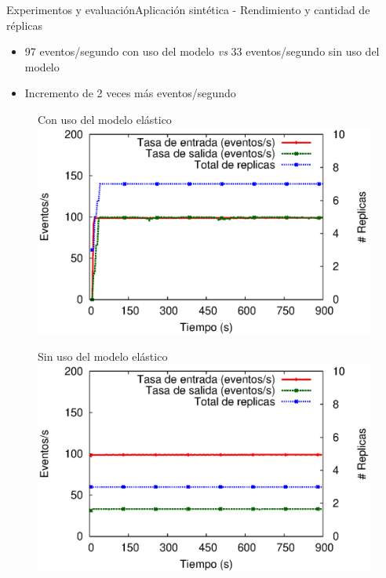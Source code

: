\begin{frame}{Experimentos y evaluación}{Aplicación sintética - Rendimiento y cantidad de réplicas}

\begin{itemize}
\item 97 eventos/segundo con uso del modelo \textit{vs} 33 eventos/segundo sin uso del modelo
\item Incremento de 2 veces más eventos/segundo
\end{itemize}

\begin{multicols}{2}
\begin{figure}[p]
	\centering
	{\scriptsize Con uso del modelo elástico\\}
	\includegraphics[scale=0.4]{images/exp/app3/cm/logical/processSystem.eps}
\end{figure}

\begin{figure}[p]
	\centering
	{\scriptsize Sin uso del modelo elástico\\}
	\includegraphics[scale=0.4]{images/exp/app3/sm/logical/processSystem.eps}
\end{figure}
\end{multicols}
\end{frame}

